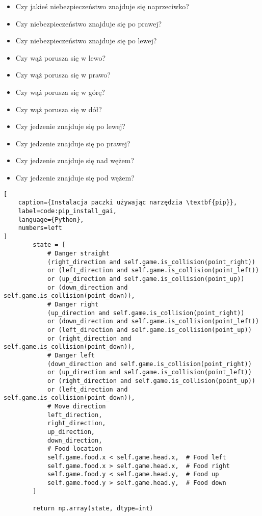 \begin{itemize}
    \item Czy jakieś niebezpieczeństwo znajduje się naprzeciwko?
    \item Czy niebezpieczeństwo znajduje się po prawej?
    \item Czy niebezpieczeństwo znajduje się po lewej?
    \item Czy wąż porusza się w lewo?
    \item Czy wąż porusza się w prawo?
    \item Czy wąż porusza się w górę?
    \item Czy wąż porusza się w dół?
    \item Czy jedzenie znajduje się po lewej?
    \item Czy jedzenie znajduje się po prawej?
    \item Czy jedzenie znajduje się nad wężem?
    \item Czy jedzenie znajduje się pod wężem?
\end{itemize}


\begin{onepage}
    \begin{lstlisting}[
    caption={Instalacja paczki używając narzędzia \textbf{pip}},
    label=code:pip_install_gai,
    language={Python},
    numbers=left
]
        state = [
            # Danger straight
            (right_direction and self.game.is_collision(point_right))
            or (left_direction and self.game.is_collision(point_left))
            or (up_direction and self.game.is_collision(point_up))
            or (down_direction and self.game.is_collision(point_down)),
            # Danger right
            (up_direction and self.game.is_collision(point_right))
            or (down_direction and self.game.is_collision(point_left))
            or (left_direction and self.game.is_collision(point_up))
            or (right_direction and self.game.is_collision(point_down)),
            # Danger left
            (down_direction and self.game.is_collision(point_right))
            or (up_direction and self.game.is_collision(point_left))
            or (right_direction and self.game.is_collision(point_up))
            or (left_direction and self.game.is_collision(point_down)),
            # Move direction
            left_direction,
            right_direction,
            up_direction,
            down_direction,
            # Food location
            self.game.food.x < self.game.head.x,  # Food left
            self.game.food.x > self.game.head.x,  # Food right
            self.game.food.y < self.game.head.y,  # Food up
            self.game.food.y > self.game.head.y,  # Food down
        ]

        return np.array(state, dtype=int)
    \end{lstlisting}
\end{onepage}

